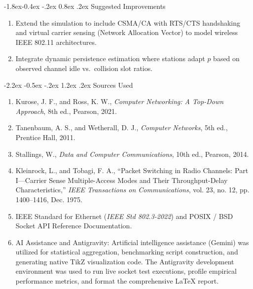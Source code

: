 \documentclass[11pt,a4paper]{article}
\makeatletter
\renewcommand\section{\@startsection {section}{1}{\z@}%
                                   {-2.2ex \@plus -0.5ex \@minus -.2ex}%
                                   {1.2ex \@plus.2ex}%
                                   {\normalfont\Large\bfseries}}
\renewcommand\subsection{\@startsection{subsection}{2}{\z@}%
                                     {-1.8ex\@plus -0.4ex \@minus -.2ex}%
                                     {0.8ex \@plus .2ex}%
                                     {\normalfont\large\bfseries}}
\makeatother
\begin{document}
\subsection{Suggested Improvements}
\begin{enumerate}
    \item Extend the simulation to include CSMA/CA with RTS/CTS handshaking and virtual carrier sensing (Network Allocation Vector) to model wireless IEEE 802.11 architectures.
    \item Integrate dynamic persistence estimation where stations adapt $p$ based on observed channel idle vs.\ collision slot ratios.
\end{enumerate}

\section{Sources Used}
\begin{enumerate}
    \item Kurose, J. F., and Ross, K. W., \textit{Computer Networking: A Top-Down Approach}, 8th ed., Pearson, 2021.
    \item Tanenbaum, A. S., and Wetherall, D. J., \textit{Computer Networks}, 5th ed., Prentice Hall, 2011.
    \item Stallings, W., \textit{Data and Computer Communications}, 10th ed., Pearson, 2014.
    \item Kleinrock, L., and Tobagi, F. A., ``Packet Switching in Radio Channels: Part I---Carrier Sense Multiple-Access Modes and Their Throughput-Delay Characteristics,'' \textit{IEEE Transactions on Communications}, vol. 23, no. 12, pp. 1400--1416, Dec. 1975.
    \item IEEE Standard for Ethernet (\textit{IEEE Std 802.3-2022}) and POSIX / BSD Socket API Reference Documentation.
    \item AI Assistance and Antigravity: Artificial intelligence assistance (Gemini) was utilized for statistical aggregation, benchmarking script construction, and generating native TikZ visualization code. The Antigravity development environment was used to run live socket test executions, profile empirical performance metrics, and format the comprehensive \LaTeX{} report.
\end{enumerate}
\end{document}
